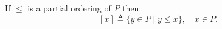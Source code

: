 If $\leq$ is a partial ordering of $P$ then:
$$[x] \triangleq \{y \in P \mid y \leq x\}, \quad x \in P.$$
